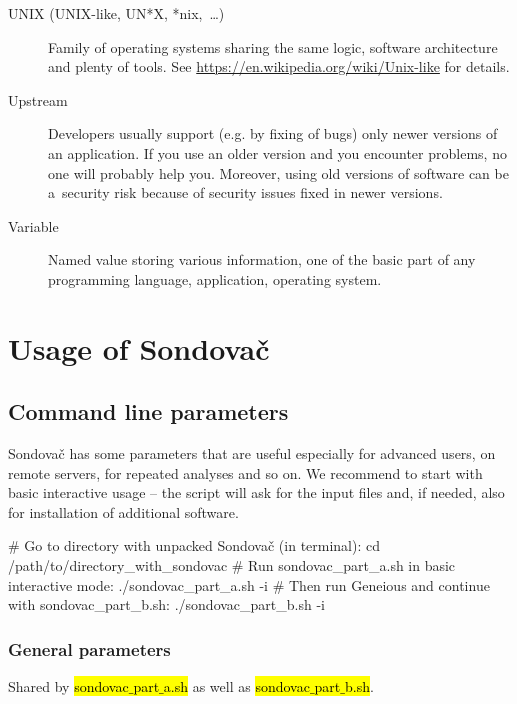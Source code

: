 \documentclass[a4paper, 11pt, twoside]{article}
\renewcommand{\texttt}[1]{\hl{\ttfamily #1}}
\begin{document}
\begin{description}
  \item[UNIX (UNIX-like, UN*X, *nix,~\ldots)] Family of operating systems sharing the same logic, software architecture and plenty of tools. See \url{https://en.wikipedia.org/wiki/Unix-like} for details.
  \item[Upstream] Developers usually support (e.g. by fixing of bugs) only newer versions of an application. If you use an older version and you encounter problems, no one will probably help you. Moreover, using old versions of software can be a~security risk because of security issues fixed in newer versions.
  \item[Variable] Named value storing various information, one of the basic part of any programming language, application, operating system.
\end{description}

\section{Usage of Sondovač}
\label{script-usage}

\subsection{Command line parameters}

Sondovač has some parameters that are useful especially for advanced users, on remote servers, for repeated analyses and so on. We recommend to start with basic interactive usage -- the script will ask for the input files and, if needed, also for installation of additional software.

\begin{bashcode}
  # Go to directory with unpacked Sondovač (in terminal):
  cd /path/to/directory_with_sondovac
  # Run sondovac_part_a.sh in basic interactive mode:
  ./sondovac_part_a.sh -i
  # Then run Geneious and continue with sondovac_part_b.sh:
  ./sondovac_part_b.sh -i
\end{bashcode}

\subsubsection{General parameters}

Shared by \texttt{sondovac$\_$part$\_$a.sh} as well as \texttt{sondovac$\_$part$\_$b.sh}.
\end{document}
